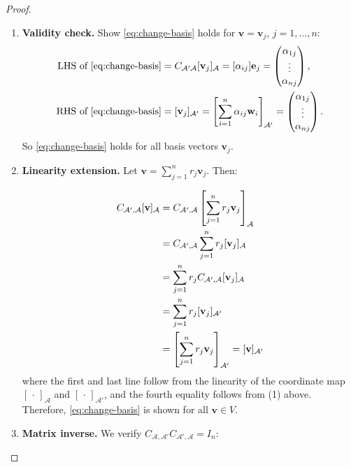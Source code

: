 \begin{proof}
\begin{enumerate}
    \item \textbf{Validity check.} Show \eqref{eq:change-basis} holds for \( \mathbf{v} = \mathbf{v}_j \), \( j = 1, \ldots, n \):
    \begin{align*}
        \text{LHS of \eqref{eq:change-basis}} &= C_{\mathcal{A}'\mathcal{A}} [{\bf v}_j]_{\mathcal{A}} =  [\alpha_{ij}] {\bf e}_j = \begin{pmatrix} \alpha_{1j} \\ \vdots \\ \alpha_{nj} \end{pmatrix}, \\
        \text{RHS of \eqref{eq:change-basis}} &= [\mathbf{v}_j]_{\mathcal{A}'} 
        = \left[ \sum_{i=1}^n \alpha_{ij} \mathbf{w}_i \right]_{\mathcal{A}'} 
        = \begin{pmatrix} \alpha_{1j} \\ \vdots \\ \alpha_{nj} \end{pmatrix}.
    \end{align*}
    So \eqref{eq:change-basis} holds for all basis vectors \( \mathbf{v}_j \).

    \item \textbf{Linearity extension.} Let \( \mathbf{v} = \sum_{j=1}^n r_j \mathbf{v}_j \). Then:

    \begin{align*}
        C_{\mathcal{A}',\mathcal{A}}[\mathbf{v}]_{\mathcal{A}} 
        &= C_{\mathcal{A}',\mathcal{A}} \left[ \sum_{j=1}^n r_j \mathbf{v}_j \right]_{\mathcal{A}}\\
        &= C_{\mathcal{A}',\mathcal{A}} \sum_{j=1}^n r_j [\mathbf{v}_j]_{\mathcal{A}} \\
        &= \sum_{j=1}^n r_j C_{\mathcal{A}',\mathcal{A}} [\mathbf{v}_j]_{\mathcal{A}}  \\
        &= \sum_{j=1}^n r_j [\mathbf{v}_j]_{\mathcal{A}'} \\
        &= \left[ \sum_{j=1}^n r_j \mathbf{v}_j \right]_{\mathcal{A}'} = [\mathbf{v}]_{\mathcal{A}'} \notag
    \end{align*}
     where the first and last line follow from the linearity of the coordinate map \( [\,\cdot\,]_{\mathcal{A}} \) and \( [\,\cdot\,]_{\mathcal{A}'} \), and the fourth equality follows from (1) above. Therefore, \eqref{eq:change-basis} is shown for all \( \mathbf{v} \in V \). 
    \item \textbf{Matrix inverse.} We verify \( C_{\mathcal{A},\mathcal{A}'} C_{\mathcal{A}',\mathcal{A}} = I_n \):


\end{enumerate}
\end{proof}
